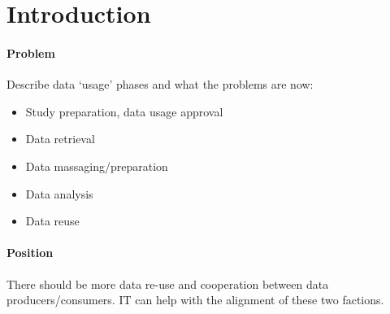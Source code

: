 \section{Introduction}
\paragraph{Problem}
Describe data `usage' phases and what the problems are now:
\begin{itemize}
	\item Study preparation, data usage approval
	\item Data retrieval
	\item Data massaging/preparation
	\item Data analysis
	\item Data reuse
\end{itemize}
\paragraph{Position}
There should be more data re-use and cooperation between data producers/consumers.
IT can help with the alignment of these two factions.